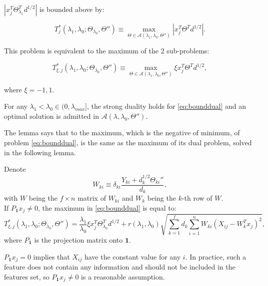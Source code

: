 $|x_j^T\Theta^T_{\lambda_1}d^{1/2}|$ is bounded above by:

\begin{equation}
    T^*_{j}(\lambda_1,\lambda_0;\Theta_{\lambda_0},\Theta'')\equiv\max_{\Theta\in\mathcal{A}(\lambda_1,{\lambda_0},\Theta'')} |x_j^T\Theta^T d^{1/2}|.
\end{equation}

This problem is equivalent to the maximum of the 2 sub-problems:

\begin{equation}
    \label{eq:bounddual}
    T^*_{\xi,j}(\lambda_1,\lambda_0;\Theta_{\lambda_0},\Theta'')\equiv\max_{\Theta\in\mathcal{A}(\lambda_1,{\lambda_0},\Theta'')} \xi x_j^T\Theta^T d^{1/2},
\end{equation}

where $\xi=-1,1$.

\begin{lemma}
    \label{lem:2}
    For any $\lambda_1<\lambda_{0}\in (0,\lambda_{max}]$, the strong duality holds for \eqref{eq:bounddual} and an optimal solution is admitted in $\mathcal{A}(\lambda,{\lambda_0},\Theta'')$.
\end{lemma}

The lemma says that to the maximum, which is the negative of minimum, of problem \eqref{eq:bounddual}, is the same as the maximum of its dual problem, solved in the following lemma.

\begin{lemma}
    \label{lem:3}
    Denote
    \begin{equation}
        \label{eq:w}
        W_{ki}\equiv\delta_{ki}\frac{Y_{ki}+d_k^{1/2}\Theta_{ki}''}{d_k},
    \end{equation}
    with $W$ being the $f\times n$ matrix of $W_{ki}$ and $W_k$ being the $k$-th row of $W$.\\
    If $P_{\mathbf{1}}x_j\neq 0$, the maximum in \eqref{eq:bounddual} is equal to:
    \begin{equation}
        \label{eq:tstar}
        T^*_{\xi,j}(\lambda_1,\lambda_0;\Theta_{\lambda_0},\Theta'')=\frac{\lambda_1}{\lambda_0}\xi x_j^T\Theta_{\lambda_0}^Td^{1/2}+r(\lambda_1,\lambda_0)\sqrt{\sum_{k=1}^fd_k\sum_{i=1}^nW_{ki}\left(X_{ij}-W_k^Tx_j\right)^2},
    \end{equation}
    where $P_{\mathbf{1}}$ is the projection matrix onto $\mathbf{1}$.
\end{lemma}

$P_{\mathbf{1}}x_j=0$ implies that $X_{ij}$ have the constant value for any $i$. In practice, such a feature does not contain any information and should not be included in the features set, so $P_{\mathbf{1}}x_j\neq 0$ is a reasonable assumption.

